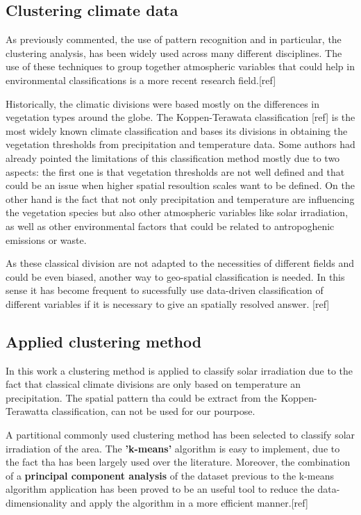 \subsection{Clustering climate data}

As previously commented, the use of pattern recognition and in particular, the clustering analysis, has been widely used across many different disciplines. The use of these techniques to group together atmospheric variables that could help in environmental classifications is a more recent research field.[ref]

Historically, the climatic divisions were based mostly on the differences in vegetation types around the globe. The Koppen-Terawata classification [ref] is the most widely known climate classification and bases its divisions in obtaining the vegetation thresholds from precipitation and temperature data. Some authors had already pointed the limitations of this classification method mostly due to two aspects: the first one is that vegetation thresholds are not well defined and that could be an issue when higher spatial resoultion scales want to be defined. On the other hand is the fact that not only precipitation and temperature are influencing the vegetation species but also other atmospheric variables like solar irradiation, as well as other environmental factors that could be related to antropoghenic emissions or waste.


As these classical division are not adapted to the necessities of different fields and could be even biased, another way to geo-spatial classification is needed. In this sense it has become frequent to sucessfully use data-driven classification of different variables if it is necessary to give an spatially resolved answer. [ref]

\subsection{Applied clustering method}

In this work a clustering method is applied to classify solar irradiation due to the fact that classical climate divisions are only based on temperature an precipitation. The spatial pattern tha could be extract from the Koppen-Terawatta classification, can not be used for our pourpose.

A partitional commonly used clustering method has been selected to classify solar irradiation of the area. The \textbf{'k-means'} algorithm is easy to implement, due to the fact tha has been largely used over the literature. Moreover, the combination of a \textbf{principal component analysis} of the dataset previous to the k-means algorithm application has been proved to be an useful tool to reduce the data-dimensionality and apply the algorithm in a more efficient manner.[ref]

